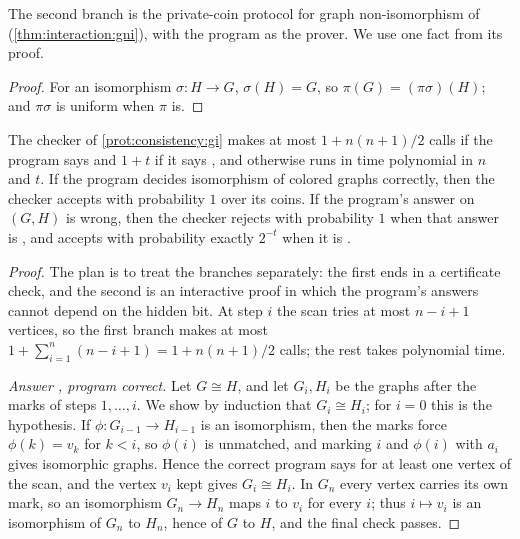 \begin{refsection}
The second branch is the private-coin protocol for graph non-isomorphism of \textcite{GoldreichMicaliWigderson1991} (\cref{thm:interaction:gni}), with the program as the prover. We use one fact from its proof.


\begin{proof}
For an isomorphism $\sigma\colon H\to G$, $\sigma(H)=G$, so $\pi(G)=(\pi\sigma)(H)$; and $\pi\sigma$ is uniform when $\pi$ is.
\end{proof}

\begin{theorem}\label{thm:consistency:gichecker}
The checker of \cref{prot:consistency:gi} makes at most $1+n(n+1)/2$ calls if the program says \consistencyyes{} and $1+t$ if it says \consistencyno, and otherwise runs in time polynomial in $n$ and $t$. If the program decides isomorphism of colored graphs correctly, then the checker accepts with probability $1$ over its coins. If the program's answer on $(G,H)$ is wrong, then the checker rejects with probability $1$ when that answer is \consistencyyes, and accepts with probability exactly $2^{-t}$ when it is \consistencyno.
\end{theorem}

\begin{proof}
The plan is to treat the branches separately: the first ends in a certificate check, and the second is an interactive proof in which the program's answers cannot depend on the hidden bit. At step $i$ the scan tries at most $n-i+1$ vertices, so the first branch makes at most $1+\sum_{i=1}^n(n-i+1)=1+n(n+1)/2$ calls; the rest takes polynomial time.

\emph{Answer \consistencyyes, program correct.} Let $G\cong H$, and let $G_i,H_i$ be the graphs after the marks of steps $1,\dots,i$. We show by induction that $G_i\cong H_i$; for $i=0$ this is the hypothesis. If $\phi\colon G_{i-1}\to H_{i-1}$ is an isomorphism, then the marks force $\phi(k)=v_k$ for $k<i$, so $\phi(i)$ is unmatched, and marking $i$ and $\phi(i)$ with $a_i$ gives isomorphic graphs. Hence the correct program says \consistencyyes{} for at least one vertex of the scan, and the vertex $v_i$ kept gives $G_i\cong H_i$. In $G_n$ every vertex carries its own mark, so an isomorphism $G_n\to H_n$ maps $i$ to $v_i$ for every $i$; thus $i\mapsto v_i$ is an isomorphism of $G_n$ to $H_n$, hence of $G$ to $H$, and the final check passes.


\end{proof}
\end{refsection}
